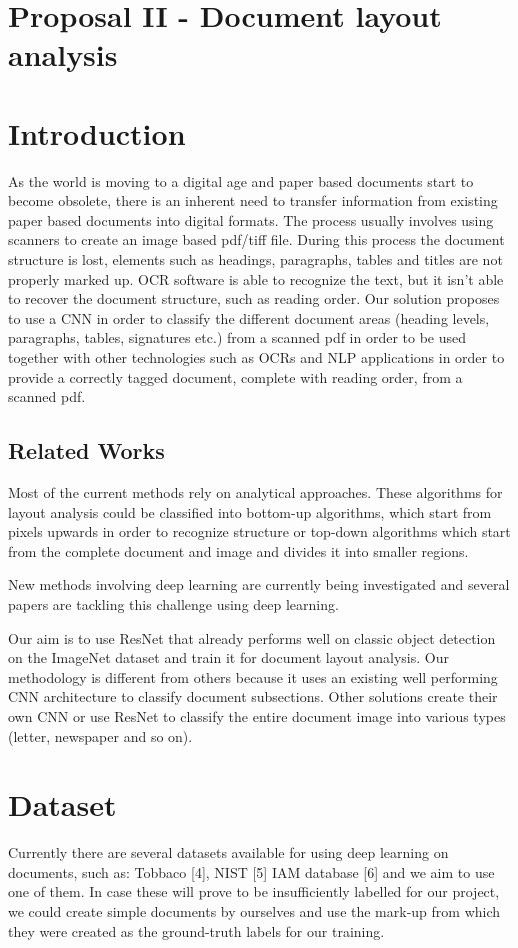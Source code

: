 \documentclass[10pt,twocolumn,letterpaper]{article}
\begin{document}
	\section*{Proposal II - Document layout analysis}
	\setcounter{section}{0}
	
	\section{Introduction}
	As the world is moving to a digital age and paper based documents start to become obsolete, there is an inherent need to transfer information from existing paper based documents into digital formats. The process usually involves using scanners to create an image based pdf/tiff file. During this process the document structure is lost, elements such as headings, paragraphs, tables and titles are not properly marked up. OCR software is able to recognize the text, but it isn't able to recover the document structure, such as reading order. Our solution proposes to use a CNN in order to classify the different document areas (heading levels, paragraphs, tables, signatures etc.) from a scanned pdf in order to be used together with other technologies such as OCRs and NLP applications in order to provide a correctly tagged document, complete with reading order, from a scanned pdf.
	
	\subsection{Related Works}
	Most of the current methods rely on analytical approaches. These algorithms for layout analysis could be classified into bottom-up algorithms, which start from pixels upwards in order to recognize structure or top-down algorithms which start from the complete document and image and divides it into smaller regions.
	
	New methods involving deep learning are currently being investigated and several papers are tackling this challenge using deep learning.
	
	Our aim is to use ResNet that already performs well on classic object detection on the ImageNet dataset and train it for document layout analysis. Our methodology is different from others because it uses an existing well performing CNN architecture to classify document subsections. Other solutions create their own CNN or use ResNet to classify the entire document image into various types (letter, newspaper and so on).
	
	\section{Dataset}
	Currently there are several datasets available for using deep learning on documents, such as: Tobbaco [4], NIST [5] IAM database [6] and we aim to use one of them. In case these will prove to be insufficiently labelled for our project, we could create simple documents by ourselves and use the mark-up from which they were created as the ground-truth labels for our training. 
	
\end{document}
